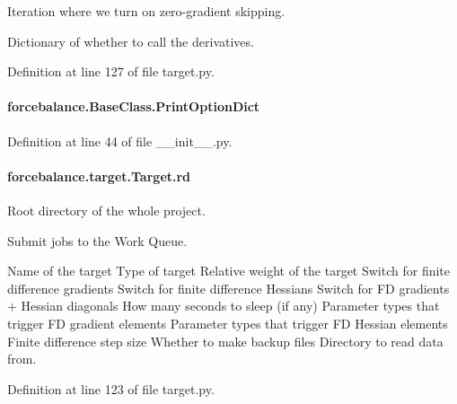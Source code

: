 Iteration where we turn on zero-\/gradient skipping. 

Dictionary of whether to call the derivatives. 

Definition at line 127 of file target.\-py.

\hypertarget{classforcebalance_1_1BaseClass_afc6659278497d7245bc492ecf405ccae}{
\paragraph[{Print\-Option\-Dict}]{\setlength{\rightskip}{0pt plus 5cm}forcebalance.\-Base\-Class.\-Print\-Option\-Dict\hspace{0.3cm}{\ttfamily [inherited]}}}\label{classforcebalance_1_1BaseClass_afc6659278497d7245bc492ecf405ccae}


Definition at line 44 of file \-\_\-\-\_\-init\-\_\-\-\_\-.\-py.

\hypertarget{classforcebalance_1_1target_1_1Target_a4edb69fbde792e9f2f27e54b7c978c8e}{
\paragraph[{rd}]{\setlength{\rightskip}{0pt plus 5cm}forcebalance.\-target.\-Target.\-rd\hspace{0.3cm}{\ttfamily [inherited]}}}\label{classforcebalance_1_1target_1_1Target_a4edb69fbde792e9f2f27e54b7c978c8e}


Root directory of the whole project. 

Submit jobs to the Work Queue.

Name of the target Type of target Relative weight of the target Switch for finite difference gradients Switch for finite difference Hessians Switch for F\-D gradients + Hessian diagonals How many seconds to sleep (if any) Parameter types that trigger F\-D gradient elements Parameter types that trigger F\-D Hessian elements Finite difference step size Whether to make backup files Directory to read data from.

Definition at line 123 of file target.\-py.

